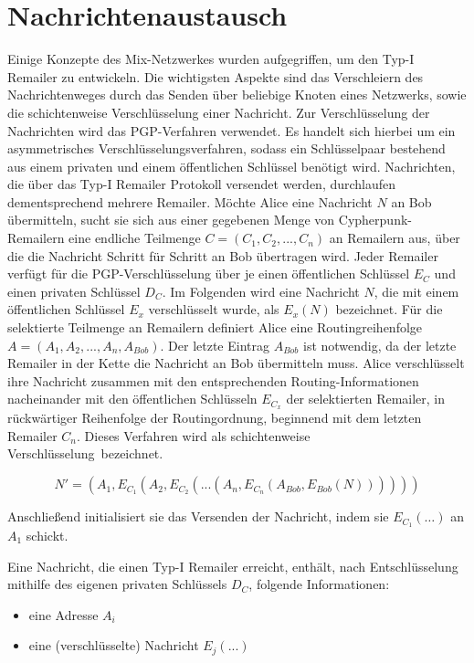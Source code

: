 \section{Nachrichtenaustausch}
Einige Konzepte des Mix-Netzwerkes wurden aufgegriffen, um den Typ-I Remailer zu entwickeln. Die wichtigsten Aspekte sind das Verschleiern des Nachrichtenweges durch das Senden über beliebige Knoten eines Netzwerks, sowie die schichtenweise Verschlüsselung einer Nachricht\cite[S. 84]{sambleben2013informationstechnologie}. Zur Verschlüsselung der Nachrichten wird das PGP-Verfahren verwendet. Es handelt sich hierbei um ein asymmetrisches Verschlüsselungsverfahren, sodass ein Schlüsselpaar bestehend aus einem privaten und einem öffentlichen Schlüssel benötigt wird.
Nachrichten, die über das Typ-I Remailer Protokoll versendet werden, durchlaufen dementsprechend mehrere Remailer. Möchte Alice eine Nachricht \(N\) an Bob übermitteln, sucht sie sich aus einer gegebenen Menge von Cypherpunk-Remailern eine endliche Teilmenge \(C = (C_1, C_2, ..., C_n)\) an Remailern aus, über die die Nachricht Schritt für Schritt an Bob übertragen wird. Jeder Remailer verfügt für die PGP-Verschlüsselung über je einen öffentlichen Schlüssel \(E_C\) und einen privaten Schlüssel \(D_C\). Im Folgenden wird eine Nachricht \(N\), die mit einem öffentlichen Schlüssel \(E_x\) verschlüsselt wurde, als \(E_x(N)\) bezeichnet. Für die selektierte Teilmenge an Remailern definiert Alice eine Routingreihenfolge \(A = (A_1, A_2, ..., A_n, A_{Bob})\). Der letzte Eintrag \(A_{Bob}\) ist notwendig, da der letzte Remailer in der Kette die Nachricht an Bob übermitteln muss.
Alice verschlüsselt ihre Nachricht zusammen mit den entsprechenden Routing-Informationen nacheinander mit den öffentlichen Schlüsseln \(E_{C_x}\) der selektierten Remailer, in rückwärtiger Reihenfolge der Routingordnung, beginnend mit dem letzten Remailer \(C_n\). Dieses Verfahren wird als \glqq schichtenweise Verschlüsselung\grqq ~bezeichnet.

\begin{equation}
N' = (A_1, E_{C_1}(A_2, E_{C_2} (... (A_n,  E_{C_n}(A_{Bob}, E_{Bob}(N))))))
\end{equation}

Anschließend initialisiert sie das Versenden der Nachricht, indem sie \(E_{C_1}(\dots)\) an \(A_1\) schickt.

Eine Nachricht, die einen Typ-I Remailer erreicht, enthält, nach Entschlüsselung mithilfe des eigenen privaten Schlüssels \(D_C\), folgende Informationen:
\begin{itemize}
\item eine Adresse \(A_i\)
\item eine (verschlüsselte) Nachricht \(E_j(...)\)
\end{itemize}


